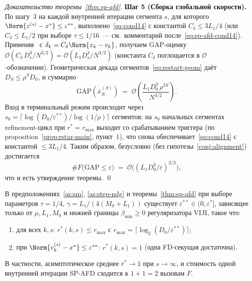 \begin{proof}[Доказательство теоремы~\ref{thm:sp-afd}]
\medskip\noindent\textbf{Шаг 5 (Сборка глобальной скорости).}
По шагу~3 на каждой внутренней итерации сегмента $s$, для которого
$\Norm{z^{(s)} - x^{*}} \le \varepsilon^{**}$, выполнено~\eqref{eq:cond14}
с константой $C_{\delta} \le 3L_1/4$ (или $C_{\delta} \le L_1/2$ при
выборе $\tau \le 1/16$~--- см.\ комментарий после~\eqref{eq:sp-afd-cond14}).
Применяя~\cite[Theorem~3.3]{Agafonov2024VIJI} с $\delta_k =
C_{\delta}\Norm{x_k - v_k}$, получаем GAP-оценку
$\mathcal O(C_{\delta}\,D_s^{3} / N^{3/2}) = \mathcal O(L_1 D_s^{3}/N^{3/2})$
(константа $C_{\delta}$ поглощается в $\mathcal O$-обозначении).
Геометрическая декада сегментов~\eqref{eq:restart-geom} даёт
$D_S \le \rho^S D_0$, и суммарно
\[
\mathrm{GAP}(\bar x^{(S)}_N)
\;=\;
\mathcal O\!\left(\frac{L_1 D_0^{3}\,\rho^{3 S}}{N^{3/2}}\right).
\]
Вход в терминальный режим происходит через
$s_0 = \lceil\log(D_0/\varepsilon^{**})/\log(1/\rho)\rceil$
сегментов; на $s_0$ начальных сегментах refinement-цикл при $r^{*} =
r_{\max}$ выходит со срабатыванием триггера (по
proposition~\ref{prop:rstar-main}, пункт~1), что снова
обеспечивает~\eqref{eq:cond14} с константой $\le 3L_1/4$. Таким
образом, безусловно (без гипотезы~\ref{conj:alignment}) достигается
\[
\#F\bigl(\mathrm{GAP} \le \varepsilon\bigr)
\;=\;
\mathcal O\!\bigl((L_1 D_0^{3}/\varepsilon)^{2/3}\bigr),
\]
что и есть утверждение теоремы. \qed
\end{proof}

\begin{proposition}
\label{prop:rstar-main}
В предположениях~\ref{as:sm}, \ref{as:step-ndg} и
теоремы~\ref{thm:sp-afd} при выборе параметров $\tau = 1/4$,
$\gamma = L_1/(4(M_0 + L_1))$ существует $\varepsilon^{**} \in (0,
\varepsilon^{*}]$, зависящее только от $\mu, L_1, M_0$ и нижней
границы $\beta_{\min} \ge 0$ регуляризатора VIJI, такое что:
\begin{enumerate}
\item для всех $k, s$: $r^{*}(k, s) \le r_{\max}$ с
      $r_{\max} = \lceil\log_2(D_0/\varepsilon^{**})\rceil$;
\item при $\Norm{v_k^{(s)} - x^{*}} \le \varepsilon^{**}$:
      $r^{*}(k, s) = 1$ (одна FD-секущая достаточна).
\end{enumerate}
В частности, асимптотическое среднее $\bar r^{*} \to 1$ при
$s \to \infty$, и стоимость одной внутренней итерации SP-AFD
сходится к $1 + 1 = 2$ вызовам $F$.
\end{proposition}

